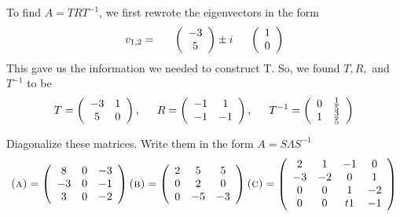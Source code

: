 \documentclass[11pt,answers]{exam}
\begin{document}
\begin{questions}
\begin{solution}
To find $A = TRT^{-1}$, we first rewrote the eigenvectors in the form
\begin{equation}
v_{1,2} = \hbox{\hspace{1.5em}} \left(\begin{array}{c} -3 \\ 5 \end{array}\right) \pm i\hbox{\hspace{1.5em}} \left(\begin{array}{c} 1 \\ 0 \end{array}\right)
\end{equation}
This gave us the information we needed to construct T. So, we found $T, R,$ and $T^{-1}$ to be
\[
T = \left(\begin{array}{cc}-3 & 1 \\5 & 0\end{array}\right), \hbox{\hspace{1.5em}} R = \left(\begin{array}{cc}-1 & 1 \\-1 & -1 \end{array}\right), \hbox{\hspace{1.5em}} T^{-1} = \left(\begin{array}{cc} 0 & \frac{1}{5}  \\  1 & \frac{3}{5} \end{array}\right)
\]
\end{solution}

\item Diagonalize these matrices.  Write them in the form $A = S\Lambda S^{-1}$
\[
\hbox{\textsc{(a)}} = \left(\begin{array}{ccc}8 & 0 & -3 \\ -3 & 0 & -1 \\ 3 & 0 & -2 \end{array}\right) 
\hbox{\hfill\textsc{(b)}} = \left(\begin{array}{ccc} 2 & 5 & 5 \\ 0 & 2 & 0 \\ 0 & -5 & -3 \end{array} \right)
\hbox{\hfill\textsc{(c)}} = \left(\begin{array}{cccc} 2 & 1 & -1 & 0 \\ -3 & -2 & 0 & 1 \\ 0 & 0 & 1 & -2 \\ 0 & 0 &t 1 & -1 \end{array}\right)
\]


\end{questions}
\end{document}

